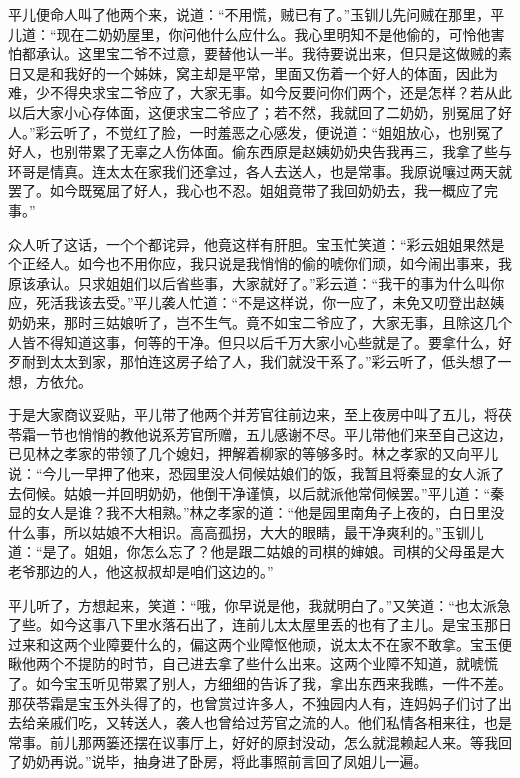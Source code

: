 平儿便命人叫了他两个来，说道：``不用慌，贼已有了。''玉钏儿先问贼在那里，平儿道：``现在二奶奶屋里，你问他什么应什么。我心里明知不是他偷的，可怜他害怕都承认。这里宝二爷不过意，要替他认一半。我待要说出来，但只是这做贼的素日又是和我好的一个姊妹，窝主却是平常，里面又伤着一个好人的体面，因此为难，少不得央求宝二爷应了，大家无事。如今反要问你们两个，还是怎样？若从此以后大家小心存体面，这便求宝二爷应了；若不然，我就回了二奶奶，别冤屈了好人。''彩云听了，不觉红了脸，一时羞恶之心感发，便说道：``姐姐放心，也别冤了好人，也别带累了无辜之人伤体面。偷东西原是赵姨奶奶央告我再三，我拿了些与环哥是情真。连太太在家我们还拿过，各人去送人，也是常事。我原说嚷过两天就罢了。如今既冤屈了好人，我心也不忍。姐姐竟带了我回奶奶去，我一概应了完事。''

众人听了这话，一个个都诧异，他竟这样有肝胆。宝玉忙笑道：``彩云姐姐果然是个正经人。如今也不用你应，我只说是我悄悄的偷的唬你们顽，如今闹出事来，我原该承认。只求姐姐们以后省些事，大家就好了。''彩云道：``我干的事为什么叫你应，死活我该去受。''平儿袭人忙道：``不是这样说，你一应了，未免又叨登出赵姨奶奶来，那时三姑娘听了，岂不生气。竟不如宝二爷应了，大家无事，且除这几个人皆不得知道这事，何等的干净。但只以后千万大家小心些就是了。要拿什么，好歹耐到太太到家，那怕连这房子给了人，我们就没干系了。''彩云听了，低头想了一想，方依允。

于是大家商议妥贴，平儿带了他两个并芳官往前边来，至上夜房中叫了五儿，将茯苓霜一节也悄悄的教他说系芳官所赠，五儿感谢不尽。平儿带他们来至自己这边，已见林之孝家的带领了几个媳妇，押解着柳家的等够多时。林之孝家的又向平儿说：``今儿一早押了他来，恐园里没人伺候姑娘们的饭，我暂且将秦显的女人派了去伺候。姑娘一并回明奶奶，他倒干净谨慎，以后就派他常伺候罢。''平儿道：``秦显的女人是谁？我不大相熟。''林之孝家的道：``他是园里南角子上夜的，白日里没什么事，所以姑娘不大相识。高高孤拐，大大的眼睛，最干净爽利的。''玉钏儿道：``是了。姐姐，你怎么忘了？他是跟二姑娘的司棋的婶娘。司棋的父母虽是大老爷那边的人，他这叔叔却是咱们这边的。''

平儿听了，方想起来，笑道：``哦，你早说是他，我就明白了。''又笑道：``也太派急了些。如今这事八下里水落石出了，连前儿太太屋里丢的也有了主儿。是宝玉那日过来和这两个业障要什么的，偏这两个业障怄他顽，说太太不在家不敢拿。宝玉便瞅他两个不提防的时节，自己进去拿了些什么出来。这两个业障不知道，就唬慌了。如今宝玉听见带累了别人，方细细的告诉了我，拿出东西来我瞧，一件不差。那茯苓霜是宝玉外头得了的，也曾赏过许多人，不独园内人有，连妈妈子们讨了出去给亲戚们吃，又转送人，袭人也曾给过芳官之流的人。他们私情各相来往，也是常事。前儿那两篓还摆在议事厅上，好好的原封没动，怎么就混赖起人来。等我回了奶奶再说。''说毕，抽身进了卧房，将此事照前言回了凤姐儿一遍。

